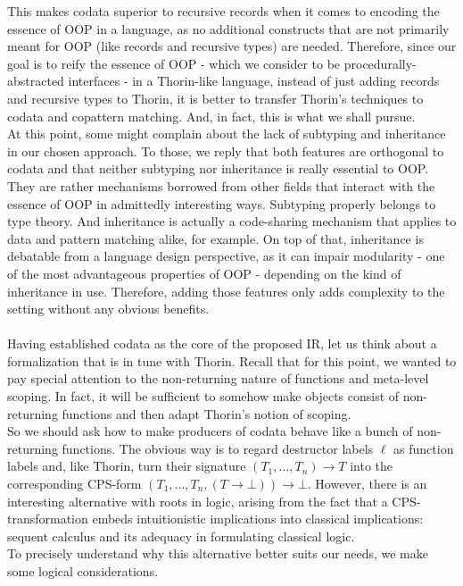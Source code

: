 This makes codata superior to recursive records when it comes to encoding the essence of OOP in a language, as no additional constructs that are not primarily meant for OOP (like records and recursive types) are needed.
Therefore, since our goal is to reify the essence of OOP - which we consider to be procedurally-abstracted interfaces - in a Thorin-like language, instead of just adding records and recursive types to Thorin, it is better to transfer Thorin's techniques to codata and copattern matching.
And, in fact, this is what we shall pursue.
\\
At this point, some might complain about the lack of subtyping and inheritance in our chosen approach.
To those, we reply that both features are orthogonal to codata and that neither subtyping nor inheritance is really essential to OOP.
They are rather mechanisms borrowed from other fields that interact with the essence of OOP in admittedly interesting ways.
Subtyping properly belongs to type theory.
And inheritance is actually a code-sharing mechanism that applies to data and pattern matching alike, for example.
On top of that, inheritance is debatable from a language design perspective, as it can impair modularity - one of the most advantageous properties of OOP - depending on the kind of inheritance in use.
Therefore, adding those features only adds complexity to the setting without any obvious benefits.
\\\\
Having established codata as the core of the proposed IR, let us think about a formalization that is in tune with Thorin.
Recall that for this point, we wanted to pay special attention to the non-returning nature of functions and meta-level scoping.
In fact, it will be sufficient to somehow make objects consist of non-returning functions and then adapt Thorin's notion of scoping.
\\
So we should ask how to make producers of codata behave like a bunch of non-returning functions.
The obvious way is to regard destructor labels $\ell$ as function labels and, like Thorin, turn their signature $(T_{1}, \ldots, T_{n}) \to T$ into the corresponding CPS-form $(T_{1}, \ldots, T_{n}, (T \to \bot)) \to \bot$.
However, there is an interesting alternative with roots in logic, arising from the fact that a CPS-transformation embeds intuitionistic implications into classical implications: sequent calculus and its adequacy in formulating classical logic.
\\
To precisely understand why this alternative better suits our needs, we make some logical considerations.
